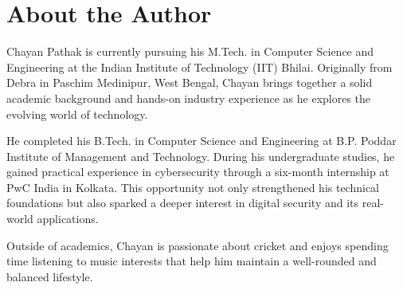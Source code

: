 \chapter{About the Author}
Chayan Pathak is currently pursuing his M.Tech. in Computer Science and Engineering at the Indian Institute of Technology (IIT) Bhilai. Originally from Debra in Paschim Medinipur, West Bengal, Chayan brings together a solid academic background and hands-on industry experience as he explores the evolving world of technology.

He completed his B.Tech. in Computer Science and Engineering at B.P. Poddar Institute of Management and Technology. During his undergraduate studies, he gained practical experience in cybersecurity through a six-month internship at PwC India in Kolkata. This opportunity not only strengthened his technical foundations but also sparked a deeper interest in digital security and its real-world applications.

Outside of academics, Chayan is passionate about cricket and enjoys spending time listening to music interests that help him maintain a well-rounded and balanced lifestyle.